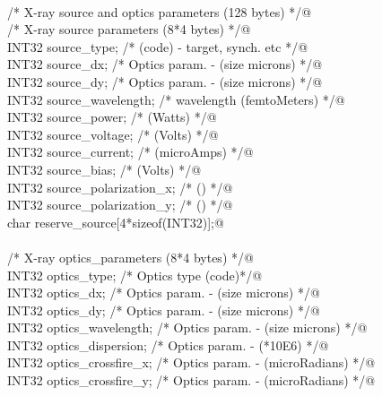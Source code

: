 \documentclass[10pt,a4paper,twoside,notitlepage]{article}
\begin{document}
\begin{flushleft}
\begin{list}{}{}
\mbox{}\verb@@\\
\mbox{}\verb@         /* X-ray source and optics parameters (128 bytes) */@\\
\mbox{}\verb@         /* X-ray source parameters (8*4 bytes) */@\\
\mbox{}\verb@         INT32 source_type;              /* (code) - target, synch. etc */@\\
\mbox{}\verb@         INT32 source_dx;                /* Optics param. - (size  microns) */@\\
\mbox{}\verb@         INT32 source_dy;                /* Optics param. - (size  microns) */@\\
\mbox{}\verb@         INT32 source_wavelength;        /* wavelength  (femtoMeters) */@\\
\mbox{}\verb@         INT32 source_power;             /* (Watts) */@\\
\mbox{}\verb@         INT32 source_voltage;           /* (Volts) */@\\
\mbox{}\verb@         INT32 source_current;           /* (microAmps) */@\\
\mbox{}\verb@         INT32 source_bias;              /* (Volts) */@\\
\mbox{}\verb@         INT32 source_polarization_x;    /* () */@\\
\mbox{}\verb@         INT32 source_polarization_y;    /* () */@\\
\mbox{}\verb@         char reserve_source[4*sizeof(INT32)];@\\
\mbox{}\verb@@\\
\mbox{}\verb@         /* X-ray optics_parameters (8*4 bytes) */@\\
\mbox{}\verb@         INT32 optics_type;              /* Optics type (code)*/@\\
\mbox{}\verb@         INT32 optics_dx;                /* Optics param. - (size  microns) */@\\
\mbox{}\verb@         INT32 optics_dy;                /* Optics param. - (size  microns) */@\\
\mbox{}\verb@         INT32 optics_wavelength;        /* Optics param. - (size  microns) */@\\
\mbox{}\verb@         INT32 optics_dispersion;        /* Optics param. - (*10E6) */@\\
\mbox{}\verb@         INT32 optics_crossfire_x;       /* Optics param. - (microRadians) */@\\
\mbox{}\verb@         INT32 optics_crossfire_y;       /* Optics param. - (microRadians) */@\\

\end{list}
\end{flushleft}
\end{document}
